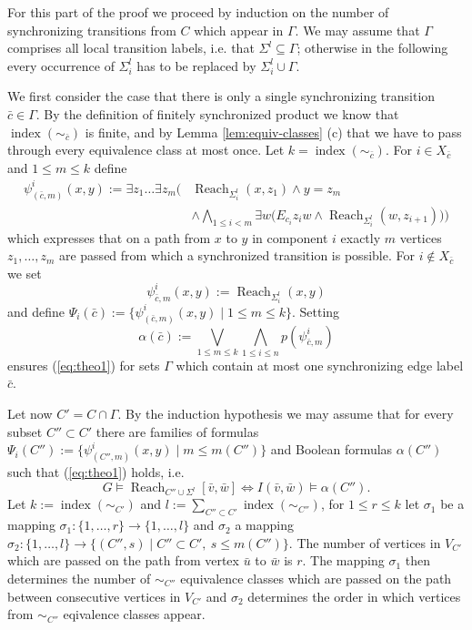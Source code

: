 \documentclass{LMCS}
\DeclareMathOperator{\Reach}{Reach}
\DeclareMathOperator{\ind}{index}
\begin{document}
For this part of the proof we proceed by induction on the number of synchronizing transitions from 
$C$ which appear in $\Gamma$. We may assume that $\Gamma$ comprises all local transition labels,
i.e. that $\Sigma^l \subseteq \Gamma$; otherwise in the following every occurrence of $\Sigma_i^l$ has to be 
replaced by $\Sigma_i^l \cup \Gamma$.

We first consider the case that there is only a single synchronizing 
transition $\bar c \in \Gamma$. By the definition of finitely synchronized 
product 
we know that $\ind(\sim_{\bar c})$ is 
finite, and by Lemma   \ref{lem:equiv-classes} (c) that we have to pass through every equivalence class
at most once. Let $k = \ind(\sim_{\bar c})$. For $i \in X_{\bar c}$ and $1 \le m \le k$ define
\begin{align*}
\psi^i_{(\bar c, m)}(x,y):= \exists z_1 \ldots \exists z_m \Big( & \Reach_{\Sigma_i^l}(x,z_1) \wedge
  y=z_m \\ 
 & \wedge \bigwedge_{1 \le i < m} \exists w \big( E_{c_i} z_i w \wedge \Reach_{\Sigma_i^l}(w, z_{i+1}) \big)\Big)
\end{align*}
which expresses that on a path from $x$ to $y$ in component $i$ exactly $m$ vertices $z_1, \ldots, z_m$
are passed from which a synchronized transition is possible.
For $i \notin X_{\bar c}$ we set 
\[\psi^i_{\bar c, m}(x,y):= \Reach_{\Sigma_i^l}(x,y)\]
and define $\Psi_i(\bar c):=\{\psi^i_{(\bar c, m)}(x,y) \mid 1 \le m \le k\}$. 
Setting 
\[\alpha(\bar c):=\bigvee_{1 \le m \le k} \bigwedge_{1 \le i \le n} p(\psi^i_{\bar c, m})\] 
ensures (\ref{eq:theo1}) for sets $\Gamma$ which contain at most one synchronizing edge label $\bar c$.

Let now $C' = C \cap \Gamma$. By the induction hypothesis we may assume that for every subset $C'' \subset C'$ 
there are families of formulas $\Psi_i(C''):=\{\psi_{(C'',m)}^i(x,y) \mid m \le m(C'')\}$ and Boolean formulas 
$\alpha(C'')$ such that (\ref{eq:theo1}) holds, i.e.
\begin{equation}\label{eq:prooftheo1}
  G \models \Reach_{C'' \cup \Sigma^l}[\bar v,\bar w ] \Leftrightarrow
  I(\bar v, \bar w) \models \alpha(C'').
\end{equation}
Let $k:=\ind(\sim_{C'})$ and $l:=\sum_{C'' \subset C'} \ind(\sim_{C''})$, 
for $1 \le r \le k$ let $\sigma_1$ be a mapping $\sigma_1: \{1,\ldots, r\} \rightarrow \{1, \ldots, l\}$
and $\sigma_2$ a mapping $\sigma_2: \{1,\ldots,l\} \rightarrow \{(C'',s) \mid C'' \subset C',\ s \le m(C'')\}$.
The number of vertices in $V_{C'}$ which are passed on the path from vertex $\bar u$ to $\bar w$ is $r$. The 
mapping $\sigma_1$ then determines the number of $\sim_{C''}$ equivalence classes which are passed on the path 
between consecutive vertices in $V_{C'}$ and $\sigma_2$ determines the order in which vertices from  $\sim_{C''}$
eqivalence classes appear.
\end{document}
